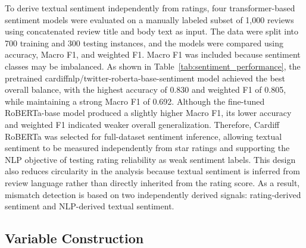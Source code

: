 \documentclass[conference]{IEEEtran}
\begin{document}
To derive textual sentiment independently from ratings, four transformer-based sentiment models were evaluated on a manually labeled subset of 1,000 reviews using concatenated review title and body text as input. The data were split into 700 training and 300 testing instances, and the models were compared using accuracy, Macro F1, and weighted F1. Macro F1 was included because sentiment classes may be imbalanced. As shown in Table~\ref{tab:sentiment_performance}, the pretrained cardiffnlp/twitter-roberta-base-sentiment model achieved the best overall balance, with the highest accuracy of 0.830 and weighted F1 of 0.805, while maintaining a strong Macro F1 of 0.692. Although the fine-tuned RoBERTa-base model produced a slightly higher Macro F1, its lower accuracy and weighted F1 indicated weaker overall generalization. Therefore, Cardiff RoBERTa was selected for full-dataset sentiment inference, allowing textual sentiment to be measured independently from star ratings and supporting the NLP objective of testing rating reliability as weak sentiment labels. This design also reduces circularity in the analysis because textual sentiment is inferred from review language rather than directly inherited from the rating score. As a result, mismatch detection is based on two independently derived signals: rating-derived sentiment and NLP-derived textual sentiment.
\begin{table}[htbp]
\caption{Sentiment Model Performance (Test Set, $n = 300$)}
\label{tab:sentiment_performance}
\centering
{}
\end{table}

\subsection{Variable Construction}
\end{document}
